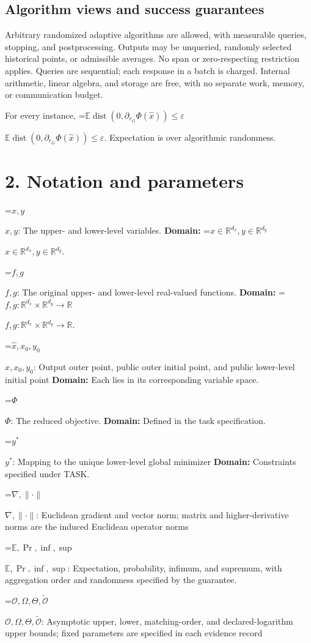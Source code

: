 \documentclass[10pt,a4paper]{article}
\newcommand{\AtlasMath}[1]{\par\begingroup\centering\setbox0=\hbox{$\displaystyle #1$}\ifdim\wd0>1.4\linewidth\typeout{ATLAS WIDE FORMULA: \the\wd0}\fi\ifdim\wd0>\linewidth\resizebox{\linewidth}{!}{\box0}\else\box0\fi\par\endgroup}
\newcommand{\AtlasInlineMath}[1]{\begingroup\setbox0=\hbox{$#1$}\ifdim\wd0>.4\linewidth\endgroup\AtlasMath{#1}\else\endgroup$#1$\fi}
\begin{document}
\subsection{Algorithm views and success guarantees}
Arbitrary randomized adaptive algorithms are allowed, with measurable queries, stopping, and postprocessing. Outputs may be unqueried, randomly selected historical points, or admissible averages. No span or zero-respecting restriction applies. Queries are sequential; each response in a batch is charged. Internal arithmetic, linear algebra, and storage are free, with no separate work, memory, or communication budget.

For every instance, \AtlasInlineMath{\mathbb{E}\operatorname{dist}(0,\partial_{r_G}\Phi(\widehat{x}))\le\varepsilon}. Expectation is over algorithmic randomness.

\section{2. Notation and parameters}
\AtlasInlineMath{x,y}: The upper- and lower-level variables. \textbf{Domain:} \AtlasInlineMath{x\in\mathbb R^{d_x},y\in\mathbb R^{d_y}}.

\AtlasInlineMath{f,g}: The original upper- and lower-level real-valued functions. \textbf{Domain:} \AtlasInlineMath{f,g:\mathbb R^{d_x}\times\mathbb R^{d_y}\to\mathbb R}.

\AtlasInlineMath{\widehat x,x_0,y_0}: Output outer point, public outer initial point, and public lower-level initial point \textbf{Domain:} Each lies in its corresponding variable space.

\AtlasInlineMath{\Phi}: The reduced objective. \textbf{Domain:} Defined in the task specification.

\AtlasInlineMath{y^*}: Mapping to the unique lower-level global minimizer \textbf{Domain:} Constraints specified under TASK.

\AtlasInlineMath{\nabla,\|\cdot\|}: Euclidean gradient and vector norm; matrix and higher-derivative norms are the induced Euclidean operator norms

\AtlasInlineMath{\mathbb E,\Pr,\inf,\sup}: Expectation, probability, infimum, and supremum, with aggregation order and randomness specified by the guarantee.

\AtlasInlineMath{\mathcal O,\Omega,\Theta,\widetilde{\mathcal O}}: Asymptotic upper, lower, matching-order, and declared-logarithm upper bounds; fixed parameters are specified in each evidence record
\end{document}
